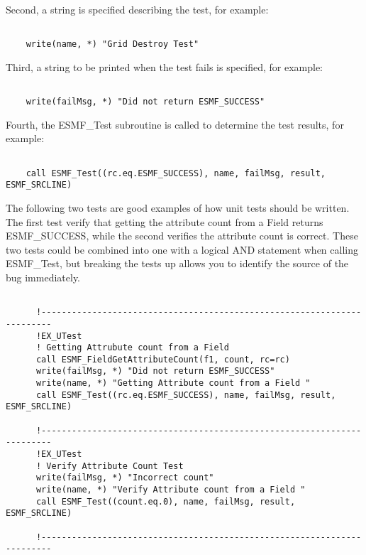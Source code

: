 Second, a string is specified describing the test, for example:
\begin{verbatim}

	write(name, *) "Grid Destroy Test"

\end{verbatim}
Third, a string to be printed when the test fails is specified, for example:
\begin{verbatim}

	write(failMsg, *) "Did not return ESMF_SUCCESS"

\end{verbatim}
Fourth, the ESMF\_Test subroutine is called to determine the test results, for example:
\begin{verbatim}

	call ESMF_Test((rc.eq.ESMF_SUCCESS), name, failMsg, result, ESMF_SRCLINE)

\end{verbatim}
The following two tests are good examples of how unit tests should be written.
The first test verify that getting the attribute count from a Field returns ESMF\_SUCCESS, while
the second verifies the attribute count is correct. These two tests could be combined into one
with a logical AND statement when calling ESMF\_Test, but breaking the tests up allows you
to identify the source of the bug immediately.
\begin{verbatim}

      !------------------------------------------------------------------------
      !EX_UTest
      ! Getting Attrubute count from a Field
      call ESMF_FieldGetAttributeCount(f1, count, rc=rc)
      write(failMsg, *) "Did not return ESMF_SUCCESS"
      write(name, *) "Getting Attribute count from a Field "
      call ESMF_Test((rc.eq.ESMF_SUCCESS), name, failMsg, result, ESMF_SRCLINE)

      !------------------------------------------------------------------------
      !EX_UTest
      ! Verify Attribute Count Test
      write(failMsg, *) "Incorrect count"
      write(name, *) "Verify Attribute count from a Field "
      call ESMF_Test((count.eq.0), name, failMsg, result, ESMF_SRCLINE)

      !------------------------------------------------------------------------

\end{verbatim}



